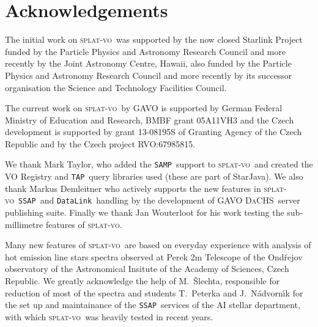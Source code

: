 \documentclass[final,authoryear,5p,times,twocolumn]{elsarticle}
\newcommand{\datalink}{\texttt{DataLink}}
\newcommand{\ssap}{\texttt{SSAP}}
\newcommand{\tap}{\texttt{TAP}}
\newcommand{\samp}{\texttt{SAMP}}
\newcommand{\splatvo}{\textsc{splat-vo}}
\newcommand{\dachs}{\textsc{DaCHS}}
\begin{document}
\section*{Acknowledgements}

The initial work on \splatvo\ was supported
by the now closed Starlink Project funded by the Particle Physics and
Astronomy Research Council and more recently by the Joint Astronomy
Centre, Hawaii, also funded by the Particle Physics and Astronomy
Research Council and more recently by its successor organisation the
Science and Technology Facilities Council.

The current work on \splatvo\ by GAVO is supported by German Federal
Ministry of Education and Research, BMBF grant 05A11VH3 and the Czech
development is supported by grant 13-08195S of Granting Agency of the
Czech Republic and by the Czech project RVO:67985815.

We thank Mark Taylor, who added the \samp\ support to \splatvo\ and created the
VO Registry and \tap\ query libraries used (these are part of StarJava).  We
also thank Markus Demleitner who actively supports the new features in
\splatvo\ \ssap\ and \datalink\ handling by the development of GAVO \dachs\
server publishing suite.  Finally we thank Jan Wouterloot for his work testing
the sub-millimetre features of \splatvo.

Many new features of \splatvo\ are based on everyday experience with
analysis of hot emission line stars spectra observed at Perek 2m
Telescope of the Ond\v{r}ejov observatory of the Astronomical Insitute
of the Academy of Sciences, Czech Republic. We greatly acknowledge the
help of M.~\v{S}lechta, responsible for reduction of most of the
spectra and students T.~Peterka and J.~N\'advorn\'\i{}k for the set up
and maintainance of the \ssap\ services of the AI stellar department,
with which \splatvo\ was heavily tested in recent years.









\end{document}
